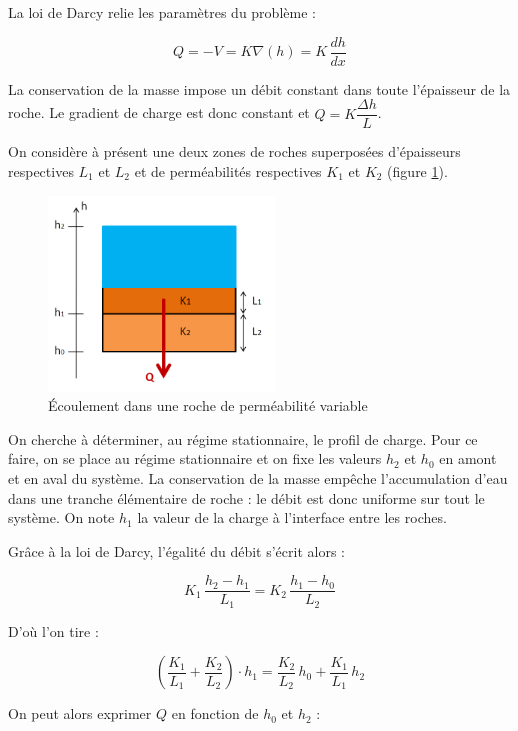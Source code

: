 \documentclass{article}
\begin{document}
La loi de Darcy relie les paramètres du problème :

$$ Q = -V = K\nabla(h) = K\,\frac{dh}{dx} $$

La conservation de la masse impose un débit constant dans toute l’épaisseur de la roche. Le gradient de charge est donc constant et $Q = K\dfrac{\Delta h}{L}$.

On considère à présent une deux zones de roches superposées d’épaisseurs respectives $L_1$ et $L_2$ et de perméabilités respectives $K_1$ et $K_2$ (figure \ref{fig:ecoulement_permea_variable}).

\begin{figure}[H]
    \centering
    \includegraphics[width=6cm]{A_III_B_2.png}
    \caption{Écoulement dans une roche de perméabilité variable}
    \label{fig:ecoulement_permea_variable}
\end{figure}

On cherche à déterminer, au régime stationnaire, le profil de charge. Pour ce faire, on se place au régime stationnaire et on fixe les valeurs $h_2$ et $h_0$ en amont et en aval du système. La conservation de la masse empêche l’accumulation d’eau dans une tranche élémentaire de roche : le débit est donc uniforme sur tout le système. On note $h_1$ la valeur de la charge à l’interface entre les roches.

Grâce à la loi de Darcy, l’égalité du débit s’écrit alors : 

$$ K_1 \,\frac{h_2 - h_1}{L_1} = K_2\, \frac{h_1 - h_0}{L_2} $$

D’où l’on tire :

$$ \left(\frac{K_1}{L_1} + \frac{K_2}{L_2}\right)\cdot h_1 = \frac{K_2}{L_2} \,h_0 + \frac{K_1}{L_1}\, h_2$$

On peut alors exprimer $Q$ en fonction de $h_0$ et $h_2$ :
\end{document}
